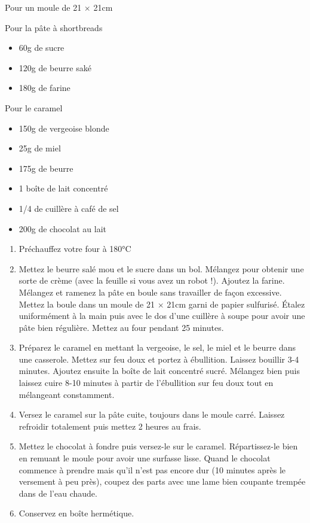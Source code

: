 \medskip
{}
{Pour un moule de 21 $\times$ 21cm}{Pour la pâte à shortbreads\begin{itemize}
\item 60g de sucre
\item 120g de beurre saké
\item 180g de farine
\end{itemize}
Pour le caramel \begin{itemize}
\item 150g de vergeoise blonde
\item 25g de miel
\item 175g de beurre
\item 1 boîte de lait concentré
\item 1/4 de cuillère à café de sel
\item 200g de chocolat au lait
\end{itemize}}
{\begin{enumerate}
\item Préchauffez votre four à 180°C
\item Mettez le beurre salé mou et le sucre dans un bol. Mélangez pour obtenir une sorte de crème (avec la feuille si vous avez un robot !). Ajoutez la farine. Mélangez et ramenez la pâte en boule sans travailler de façon excessive. Mettez la boule dans un moule de 21 $\times$ 21cm garni de papier sulfurisé. Étalez uniformément à la main puis avec le dos d'une cuillère à soupe pour avoir une pâte bien régulière. Mettez au four pendant 25 minutes.
\item Préparez le caramel en mettant la vergeoise, le sel, le miel et le beurre dans une casserole. Mettez sur feu doux et portez à ébullition. Laissez bouillir 3-4 minutes. Ajoutez ensuite la boîte de lait concentré sucré. Mélangez bien puis laissez cuire 8-10 minutes à partir de l'ébullition sur feu doux tout en mélangeant constamment.
\item Versez le caramel sur la pâte cuite, toujours dans le moule carré. Laissez refroidir totalement puis mettez 2 heures au frais.
\item Mettez le chocolat à fondre puis versez-le sur le caramel. Répartissez-le bien en remuant le moule pour avoir une surfasse lisse. Quand le chocolat commence à prendre mais qu'il n'est pas encore dur (10 minutes après le versement à peu près), coupez des parts avec une lame bien coupante trempée dans de l'eau chaude.
\item Conservez en boîte hermétique.
\end{enumerate}}
